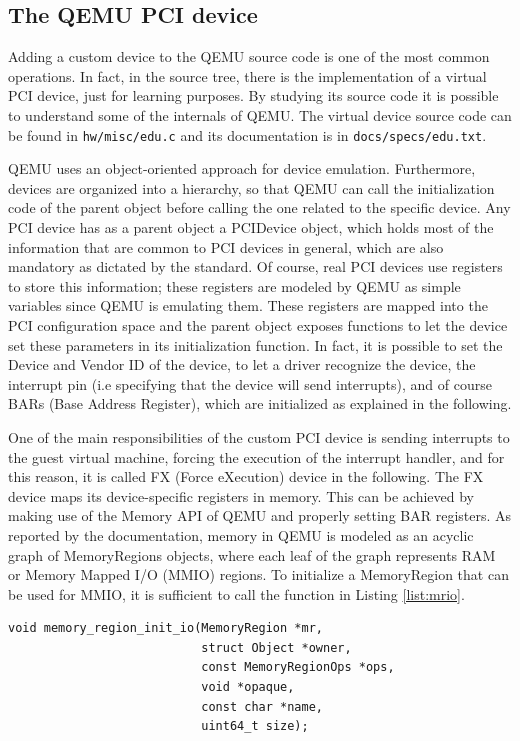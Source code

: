 \subsection{The QEMU PCI device}
Adding a custom device to the QEMU source code is one of the most common operations. In fact, in the source tree, there is the implementation of a virtual PCI device, just for learning purposes. By studying its source code it is possible to understand some of the internals of QEMU. The virtual device source code can be found in \texttt{hw/misc/edu.c} and its documentation is in \texttt{docs/specs/edu.txt}. 
\par QEMU uses an object-oriented approach for device emulation. Furthermore, devices are organized into a hierarchy, so that QEMU can call the initialization code of the parent object before calling the one related to the specific device. Any PCI device has as a parent object a PCIDevice object, which holds most of the information that are common to PCI devices in general, which are also mandatory as dictated by the standard. Of course, real PCI devices use registers to store this information; these registers are modeled by QEMU as simple variables since QEMU is emulating them. These registers are mapped into the PCI configuration space and the parent object exposes functions to let the device set these parameters in its initialization function. In fact, it is possible to set the Device and Vendor ID of the device, to let a driver recognize the device, the interrupt pin (i.e specifying that the device will send interrupts), and of course BARs (Base Address Register), which are initialized as explained in the following.
\par One of the main responsibilities of the custom PCI device is sending interrupts to the guest virtual machine, forcing the execution of the interrupt handler, and for this reason, it is called FX (Force eXecution) device in the following. The FX device maps its device-specific registers in memory. This can be achieved by making use of the Memory API of QEMU \cite{mem-api} and properly setting BAR registers. As reported by the documentation, memory in QEMU is modeled as an acyclic graph of MemoryRegions objects, where each leaf of the graph represents RAM or Memory Mapped I/O (MMIO) regions. To initialize a MemoryRegion that can be used for MMIO, it is sufficient to call the function in Listing \ref{list:mrio}. 
\begin{lstlisting}[style=c, caption={Initialization function of a MMIO memory region}, label={list:mrio}]
void memory_region_init_io(MemoryRegion *mr,
                           struct Object *owner,
                           const MemoryRegionOps *ops,
                           void *opaque,
                           const char *name,
                           uint64_t size);
\end{lstlisting}
